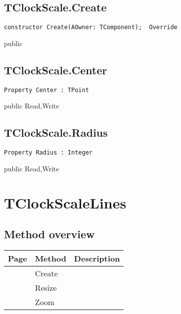 \subsection{TClockScale.Create}
\label{hmi:retroclock:tclockscale:create}
\begin{FPCList}
\Declaration 

\begin{verbatim}
constructor Create(AOwner: TComponent);  Override
\end{verbatim}
\Visibility
public
\end{FPCList}
\subsection{TClockScale.Center}
\label{hmi:retroclock:tclockscale:center}
\begin{FPCList}
\Declaration 

\begin{verbatim}
Property Center : TPoint
\end{verbatim}
\Visibility
public
\Access
Read,Write
\end{FPCList}
\subsection{TClockScale.Radius}
\label{hmi:retroclock:tclockscale:radius}
\begin{FPCList}
\Declaration 

\begin{verbatim}
Property Radius : Integer
\end{verbatim}
\Visibility
public
\Access
Read,Write
\end{FPCList}
\section{TClockScaleLines}
\label{hmi:retroclock:tclockscalelines}
\subsection{Method overview}
\label{hmi:retroclock:tclockscalelines:methods}
\begin{tabularx}{\textwidth}{llX}
Page & Method & Description  \\ \hline
\pageref{hmi:retroclock:tclockscalelines:create} & Create  &  \\
\pageref{hmi:retroclock:tclockscalelines:resize} & Resize  &  \\
\pageref{hmi:retroclock:tclockscalelines:zoom} & Zoom  &  \\
\hline
\end{tabularx}
